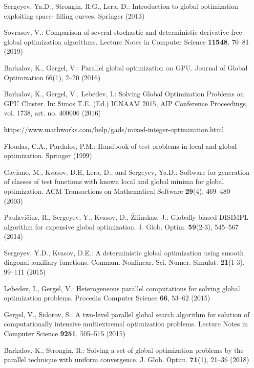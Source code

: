 \documentclass[runningheads]{llncs}
\begin{document}
\begin{thebibliography}{10}
Sergeyev, Ya.D., Strongin, R.G., Lera, D.: Introduction to global optimization exploiting space-
filling curves. Springer (2013) %

Sovrasov, V.: Comparison of several stochastic and deterministic derivative-free global optimization algorithms. 	Lecture Notes in Computer Science  \textbf{11548}, 70--81 (2019)

Barkalov, K., Gergel, V.: Parallel global optimization on GPU. Journal of Global Optimization
66(1), 2--20 (2016)

Barkalov, K., Gergel, V., Lebedev, I.: Solving Global Optimization Problems on GPU Cluster.
In: Simos T.E. (Ed.) ICNAAM 2015, AIP Conference Proceedings, vol. 1738, art. no. 400006
(2016)

https://www.mathworks.com/help/gads/mixed-integer-optimization.html

Floudas, C.A., Pardalos, P.M.:  Handbook of test problems in local and global optimization.
Springer (1999)  %

 Gaviano, M., Kvasov, D.E, Lera, D., and Sergeyev, Ya.D.: Software for
generation of classes of test functions with known local and global minima for global
optimization. ACM Transactions on Mathematical Software \textbf{29}(4), 469--480 (2003)

Paulavi\v{c}ius, R., Sergeyev, Y., Kvasov, D., \v{Z}ilinskas, J.: Globally-biased DISIMPL
algorithm for expensive global optimization. J. Glob. Optim. \textbf{59}(2-3), 545--567 (2014)

Sergeyev, Y.D., Kvasov, D.E.: A deterministic global optimization using smooth diagonal
auxiliary functions. Commun. Nonlinear. Sci. Numer. Simulat. \textbf{21}(1-3), 99--111 (2015)

Lebedev, I., Gergel, V.: Heterogeneous parallel computations for solving global optimization
problems. Procedia Computer Science \textbf{66}, 53--62 (2015)

Gergel, V., Sidorov, S.: A two-level parallel global search algorithm for solution of
computationally intensive multiextremal optimization problems. Lecture Notes in Computer
Science  \textbf{9251}, 505--515 (2015)

Barkalov, K., Strongin, R.: Solving a set of global optimization problems by the parallel technique with uniform convergence. J. Glob. Optim. \textbf{71}(1), 21--36 (2018)


\end{thebibliography}
\end{document}
